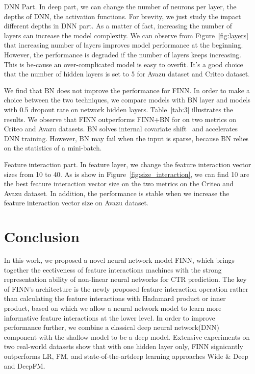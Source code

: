 \documentclass[journal]{IEEEtran}
\begin{document}
DNN Part. In deep part, we can change the number of neurons per layer, the depths of DNN, the activation functions. For brevity, we just study the impact different depths in DNN part. As a matter of fact, increasing the number of layers can increase the model complexity. We can observe from Figure~\ref{fig:layers} that increasing number of layers improves model performance at the beginning. However, the performance is degraded if the number of layers keeps increasing. This is be-cause an over-complicated model is easy to overfit. It’s a good choice that the number of hidden layers is set to 5 for Avazu dataset and Criteo dataset.

We find that BN does not improve the performance for FINN. In order to make a choice between the two techniques, we compare models with BN layer and models with 0.5 dropout rate on network hidden layers. Table~\ref{tab:3} illustrates the results. We observe that FINN outperforms FINN+BN for on two metrics on Criteo and Avazu datasets. BN solves internal covariate shift~\cite{24} and accelerates DNN training. However, BN may fail when the input is sparse, because BN relies on the statistics of a mini-batch.

Feature interaction part. In feature layer, we change the feature interaction vector sizes from 10 to 40. As is show in Figure~\ref{fig:size_interaction}, we can find 10 are the best feature interaction vector size on the two metrics on the Criteo and Avazu dataset. In addition, the performance is stable when we increase the feature interaction vector size on Avazu dataset.



\section{Conclusion}
In this work, we proposed a novel neural network model FINN, which brings together the eectiveness of feature interactions machines with the strong representation ability of non-linear neural networks for CTR prediction. The key of FINN’s architecture is the newly proposed feature interaction operation rather than calculating the feature interactions with Hadamard product or inner product, based on which we allow a neural network model to learn more informative feature interactions at the lower level. In order to improve performance further, we combine a classical deep neural network(DNN) component with the shallow model to be a deep model. Extensive experiments on two real-world datasets show that with one hidden layer only, FINN signicantly outperforms LR,  FM, and state-of-the-artdeep learning approaches Wide \& Deep and DeepFM.







\end{document}
